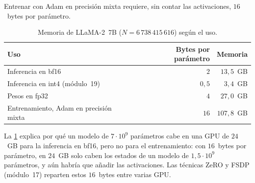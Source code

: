 \begin{proposicion}\label{prop:16bytes}
Entrenar con Adam en precisión mixta requiere, sin contar las activaciones, $16$~bytes por parámetro.
\end{proposicion}

\begin{table}[ht]
\centering\small
\caption{Memoria de LLaMA-2~7B ($N=6\,738\,415\,616$) según el uso.}\label{tab:memoria}
\begin{tabular}{@{}lrr@{}}
\toprule
Uso & Bytes por parámetro & Memoria \\
\midrule
Inferencia en bf16 & $2$ & $13{,}5$~GB \\
Inferencia en int4 (módulo~19) & $0{,}5$ & $3{,}4$~GB \\
Pesos en fp32 & $4$ & $27{,}0$~GB \\
Entrenamiento, Adam en precisión mixta & $16$ & $107{,}8$~GB \\
\bottomrule
\end{tabular}
\end{table}

La \cref{tab:memoria} explica por qué un modelo de $7\cdot 10^{9}$ parámetros cabe en una GPU de $24$~GB para la inferencia en bf16, pero no para el entrenamiento: con $16$~bytes por parámetro, en $24$~GB solo caben los estados de un modelo de $1{,}5\cdot 10^{9}$ parámetros, y aún habría que añadir las activaciones. Las técnicas ZeRO y FSDP (módulo~17) reparten estos $16$~bytes entre varias GPU.

\addtocounter{definicion}{1}%

